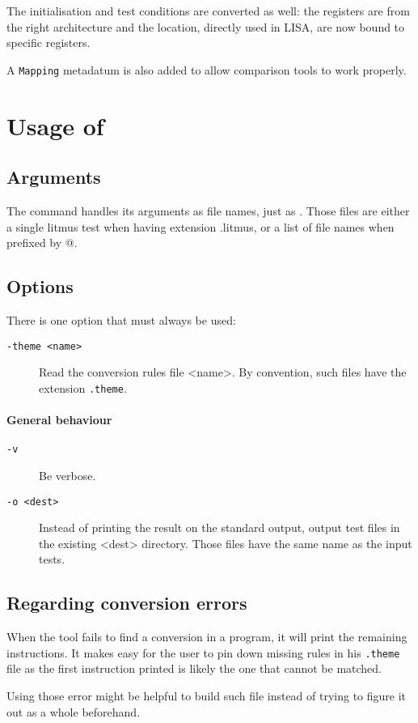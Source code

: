 The initialisation and test conditions are converted as well:
the registers are from the right architecture and
the location, directly used in LISA, are now bound to
specific registers.

A \verb+Mapping+ metadatum is also added to allow comparison tools
to work properly.

\section{Usage of \jingle{}}

\subsection{Arguments}
The command \jingle{} handles its arguments as file names, just as \herd{}.
Those files are either a single litmus test when having extension .litmus,
or a list of file names when prefixed by @.

\subsection{Options}
There is one option that must always be used:

\begin{description}
\item[{\tt -theme <name>}] Read the conversion rules file <name>.
By convention, such files have the extension \verb+.theme+.
\end{description}

\paragraph{General behaviour}
\begin{description}
\item[{\tt -v}] Be verbose.
\item[{\tt -o <dest>}] Instead of printing the result on the standard output,
output test files in the existing <dest> directory. Those files have the same
name as the input tests.
\end{description}

\subsection{Regarding conversion errors}
When the tool fails to find a conversion in a program, it will print the remaining instructions.
It makes easy for the user to pin down missing rules in his \verb+.theme+ file
as the first instruction printed is likely the one that cannot be matched.

Using those error might be helpful to build such file instead of trying to figure it out
as a whole beforehand.
